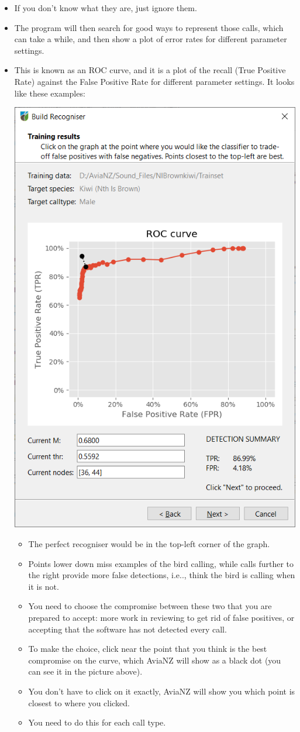 \documentclass{article}
\begin{document}
\begin{itemize}
\item If you don't know what they are, just ignore them. 
\item The program will then search for good ways to represent those calls, which can take a while, and then show a plot of error rates for different parameter settings. 
\item This is known as an ROC curve, and it is a plot of the recall (True Positive Rate) against the False Positive Rate for different parameter settings. It looks like these examples:
\begin{center}
    \includegraphics[width=.4\textwidth]{Figs/Wizard_ROC}
\end{center}

\begin{itemize}
\item The perfect recogniser would be in the top-left corner of the graph. 
\item Points lower down miss examples of the bird calling, while calls further to the right provide more false detections, i.e.., think the bird is calling when it is not. 
\item You need to choose the compromise between these two that you are prepared to accept: more work in reviewing to get rid of false positives, or accepting that the software has not detected every call. 
\item To make the choice, click near the point that you think is the best compromise on the curve, which AviaNZ will show as a black dot (you can see it in the picture above). 
\item You don't have to click on it exactly, AviaNZ will show you which point is closest to where you clicked. 
\item You need to do this for each call type. 
\end{itemize}


\end{itemize}
\end{document}
